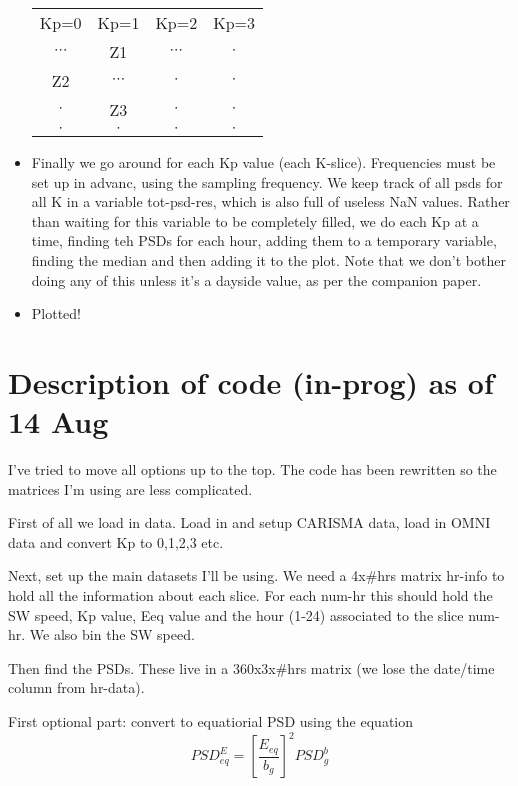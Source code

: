 \documentclass[11pt]{article}
\begin{document}
\begin{itemize}
        \begin{table}[h]
            \begin{tabular}{cccc}
                Kp=0 &Kp=1 &Kp=2 &Kp=3 \\
                $\cdots$ &Z1 &$\cdots$ &$\cdot$ \\
                Z2 &$\cdots$ &$\cdot$ &$\cdot$ \\
                $\cdot$ &Z3 &$\cdot$ &$\cdot$ \\
                $\cdot$ &$\cdot$ &$\cdot$ &$\cdot$ 
            \end{tabular}
        \end{table}
    \item Finally we go around for each Kp value (each K-slice). Frequencies must be set up in
        advanc, using the sampling frequency. We keep track of all psds for all K in a variable
        tot-psd-res, which is also full of useless NaN values. Rather than waiting for this
        variable to be completely filled, we do each Kp at a time, finding teh PSDs for each hour,
        adding them to a temporary variable, finding the median and then adding it to the plot.
        Note that we don't bother doing any of this unless it's a dayside value, as per the
        companion paper.
    \item Plotted!


\end{itemize}


\section{Description of code (in-prog) as of 14 Aug}
I've tried to move all options up to the top. The code has been rewritten so the matrices I'm
using are less complicated.

First of all we load in data. Load in and setup CARISMA data, load in OMNI data and convert Kp to
0,1,2,3 etc.

Next, set up the main datasets I'll be using. We need a 4x\#hrs matrix hr-info to hold all the
information about each slice. For each num-hr this should hold the SW speed, Kp value, Eeq value and the hour (1-24)
associated to the slice num-hr. We also bin the SW speed.

Then find the PSDs. These live in a 360x3x\#hrs matrix (we lose the date/time column from hr-data).

First optional part: convert to equatiorial PSD using the equation
\begin{equation}
    PSD_{eq}^E = \left[ \frac{E_{eq}}{b_g} \right]^2 PSD_g^b
\end{equation}
\end{document}
